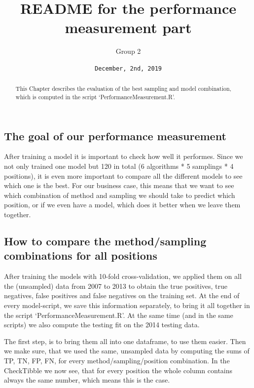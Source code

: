 \documentclass[]{article}
\title{README for the performance measurement part}
\author{Group 2}
\date{\texttt{December,\ 2nd,\ 2019}}
\begin{document}
\maketitle
\begin{abstract}
This Chapter describes the evaluation of the best sampling and model
combination, which is computed in the script `PerformanceMeasurement.R'.
\end{abstract}

\hypertarget{the-goal-of-our-performance-measurement}{%
\subsection{The goal of our performance
measurement}\label{the-goal-of-our-performance-measurement}}

After training a model it is important to check how well it performes.
Since we not only trained one model but 120 in total (6 algorithms * 5
samplings * 4 positions), it is even more important to compare all the
different models to see which one is the best. For our business case,
this means that we want to see which combination of method and sampling
we should take to predict which position, or if we even have a model,
which does it better when we leave them together.

\hypertarget{how-to-compare-the-methodsampling-combinations-for-all-positions}{%
\subsection{How to compare the method/sampling combinations for all
positions}\label{how-to-compare-the-methodsampling-combinations-for-all-positions}}

After training the models with 10-fold cross-validation, we applied them
on all the (unsampled) data from 2007 to 2013 to obtain the true
positives, true negatives, false positives and false negatives on the
training set. At the end of every model-script, we save this information
separately, to bring it all together in the script
`PerformanceMeasurement.R'. At the same time (and in the same scripts)
we also compute the testing fit on the 2014 testing data.

The first step, is to bring them all into one dataframe, to use them
easier. Then we make sure, that we used the same, unsampled data by
computing the sums of TP, TN, FP, FN, for every method/sampling/position
combination. In the CheckTibble we now see, that for every position the
whole column contains always the same number, which means this is the
case.
\end{document}
